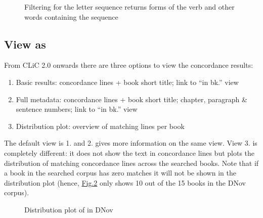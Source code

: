 \documentclass[letterpaper,10pt,english]{sphinxmanual}
\begin{document}
\begin{figure}[htbp]
\centering
\capstart

\noindent{}
\caption{Filtering for the letter sequence  returns forms of
the verb  and other words containing the sequence}\label{\detokenize{clicanalysis/concordance:id11}}\label{\detokenize{clicanalysis/concordance:figure-analysis-concordance-results-filtersequence}}\end{figure}


\subsection{View as}
\label{\detokenize{clicanalysis/concordance:view-as}}
\sphinxAtStartPar
From CLiC 2.0 onwards there are three options to view the concordance results:
\begin{enumerate}
%
\item {} 
\sphinxAtStartPar
Basic results: concordance lines + book short title; link to “in bk.” view

\item {} 
\sphinxAtStartPar
Full metadata: concordance lines + book short title; chapter, paragraph \&
sentence numbers; link to “in bk.” view

\item {} 
\sphinxAtStartPar
Distribution plot: overview of matching lines per book

\end{enumerate}

\sphinxAtStartPar
The default view is 1. and 2. gives more information on the same view. View 3.
is completely different: it does not show the text in concordance lines but plots
the distribution of matching concordance lines across the searched books. Note that
if a book in the searched corpus has zero matches it will not be shown in
the distribution plot (hence, \hyperref[\detokenize{clicanalysis/concordance:figure-distribution-plot-workhouse}]{Fig.\@ \ref{\detokenize{clicanalysis/concordance:figure-distribution-plot-workhouse}}} only shows
10 out of the 15 books in the DNov corpus).

\begin{figure}[htbp]
\centering
\capstart

\noindent{}
\caption{Distribution plot of  in DNov}\label{\detokenize{clicanalysis/concordance:id12}}\label{\detokenize{clicanalysis/concordance:figure-distribution-plot-workhouse}}\end{figure}
\end{document}
